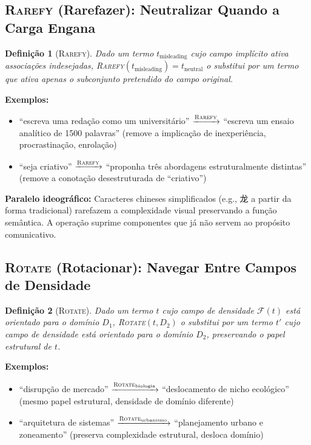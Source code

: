 \documentclass[12pt,a4paper]{article}
\newcommand{\cjk}[1]{{\cjkfont #1}}
\newtheorem{definition}{Definição}[section]
\begin{document}
\subsection{\textsc{Rarefy} (Rarefazer): Neutralizar Quando a Carga Engana}
\label{subsec:rarefy}

\begin{definition}[\textsc{Rarefy}]
Dado um termo $t_{\text{misleading}}$ cujo campo implícito ativa associações indesejadas, \textsc{Rarefy}$(t_{\text{misleading}}) = t_{\text{neutral}}$ o substitui por um termo que ativa apenas o subconjunto pretendido do campo original.
\end{definition}

\textbf{Exemplos:}
\begin{itemize}
  \item ``escreva uma redação como um universitário'' $\xrightarrow{\textsc{Rarefy}}$ ``escreva um ensaio analítico de 1500 palavras'' (remove a implicação de inexperiência, procrastinação, enrolação)
  \item ``seja criativo'' $\xrightarrow{\textsc{Rarefy}}$ ``proponha três abordagens estruturalmente distintas'' (remove a conotação desestruturada de ``criativo'')
\end{itemize}

\textbf{Paralelo ideográfico:}
Caracteres chineses simplificados (e.g., \cjk{龙} a partir da forma tradicional) rarefazem a complexidade visual preservando a função semântica.
A operação suprime componentes que já não servem ao propósito comunicativo.

\subsection{\textsc{Rotate} (Rotacionar): Navegar Entre Campos de Densidade}
\label{subsec:rotate}

\begin{definition}[\textsc{Rotate}]
Dado um termo $t$ cujo campo de densidade $\mathcal{F}(t)$ está orientado para o domínio $D_1$, \textsc{Rotate}$(t, D_2)$ o substitui por um termo $t'$ cujo campo de densidade está orientado para o domínio $D_2$, preservando o papel estrutural de $t$.
\end{definition}

\textbf{Exemplos:}
\begin{itemize}
  \item ``disrupção de mercado'' $\xrightarrow{\textsc{Rotate}_{\text{biologia}}}$ ``deslocamento de nicho ecológico'' (mesmo papel estrutural, densidade de domínio diferente)
  \item ``arquitetura de sistemas'' $\xrightarrow{\textsc{Rotate}_{\text{urbanismo}}}$ ``planejamento urbano e zoneamento'' (preserva complexidade estrutural, desloca domínio)
\end{itemize}
\end{document}
